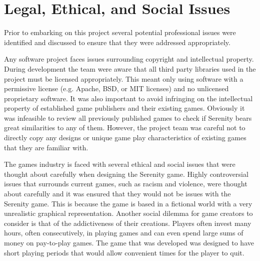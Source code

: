 \section{Legal, Ethical, and Social Issues}
\label{sec:legal}

Prior to embarking on this project several potential professional issues were identified
and discussed to ensure that they were addressed appropriately.

Any software project faces issues surrounding copyright and intellectual property. During
development the team were aware that all third party libraries used in the project must
be licensed appropriately. This meant only using software with a permissive license (e.g.
Apache, BSD, or MIT licenses) and no unlicensed proprietary software. It was also important
to avoid infringing on the intellectual property of established game publishers and their
existing games. Obviously it was infeasible to review all previously published games to
check if Serenity bears great similarities to any of them. However, the project team was
careful not to directly copy any designs or unique game play characteristics of existing
games that they are familiar with.

The games industry is faced with several ethical and social issues that were thought about
carefully when designing the Serenity game. Highly controversial issues that surrounds
current games, such as racism and violence, were thought about carefully and it was ensured
that they would not be issues with the Serenity game. This is because the game is based
in a fictional world with a very unrealistic graphical representation. Another social
dilemma for game creators to consider is that of the addictiveness of their creations.
Players often invest many hours, often consecutively, in playing games and can even spend
large sums of money on pay-to-play games. The game that was developed was designed to
have short playing periods that would allow convenient times for the player to quit.
